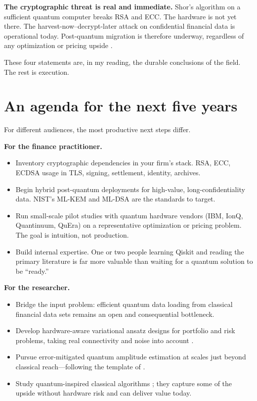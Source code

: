 \textbf{The cryptographic threat is real and immediate.} Shor's algorithm on a sufficient quantum computer breaks RSA and ECC. The hardware is not yet there. The harvest-now--decrypt-later attack on confidential financial data is operational today. Post-quantum migration is therefore underway, regardless of any optimization or pricing upside \citep{auer_quantum_2024,nist_fips203_2024}.

These four statements are, in my reading, the durable conclusions of the field. The rest is execution.

\section{An agenda for the next five years}

For different audiences, the most productive next steps differ.

\textbf{For the finance practitioner.}
\begin{itemize}
  \item Inventory cryptographic dependencies in your firm's stack. RSA, ECC, ECDSA usage in TLS, signing, settlement, identity, archives.
  \item Begin hybrid post-quantum deployments for high-value, long-confidentiality data. NIST's ML-KEM and ML-DSA are the standards to target.
  \item Run small-scale pilot studies with quantum hardware vendors (IBM, IonQ, Quantinuum, QuEra) on a representative optimization or pricing problem. The goal is intuition, not production.
  \item Build internal expertise. One or two people learning Qiskit and reading the primary literature is far more valuable than waiting for a quantum solution to be ``ready.''
\end{itemize}

\textbf{For the researcher.}
\begin{itemize}
  \item Bridge the input problem: efficient quantum data loading from classical financial data sets remains an open and consequential bottleneck.
  \item Develop hardware-aware variational ansatz designs for portfolio and risk problems, taking real connectivity and noise into account \citep{cerezo_variational_2021}.
  \item Pursue error-mitigated quantum amplitude estimation at scales just beyond classical reach---following the template of \citet{kim_evidence_2023}.
  \item Study quantum-inspired classical algorithms \citep{chou_quantum-inspired_2026}; they capture some of the upside without hardware risk and can deliver value today.
\end{itemize}

